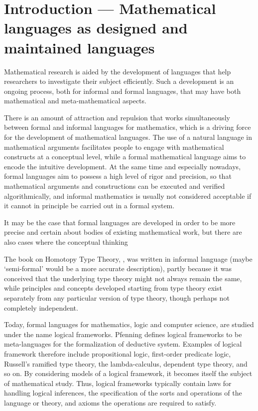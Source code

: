 \section{Introduction --- Mathematical languages as designed and maintained languages}
Mathematical research is aided by the development of languages that help 
researchers to investigate their subject efficiently. Such a development is an
ongoing process, both for informal and formal languages, that may have both
mathematical and meta-mathematical aspects. 

There is an amount of attraction and repulsion that works simultaneously
between formal and informal languages for mathematics, which is a driving force
for the development of mathematical languages. The use of
a natural language in mathematical arguments facilitates people to engage
with mathematical constructs at a conceptual level, while a formal mathematical
language aims to encode the intuitive development. At the same time and 
especially nowadays, formal languages aim to possess a high level of rigor and
precision, so that mathematical arguments and constructions can be executed and
verified algorithmically, and informal mathematics is usually not considered
acceptable if it cannot in principle be carried out in a formal system.

It may be the case that formal languages are developed in order to be more
precise and certain about bodies of existing mathematical work, but there are
also cases where the conceptual thinking 

The book on Homotopy Type Theory, \cite{TheBook}, was written in informal
language (maybe `semi-formal' would be a more accurate description), 
partly because it was conceived that the underlying type theory might
not always remain the same, while principles and concepts developed starting
from type theory exist separately from any particular version of type 
theory, though perhaps not completely independent. 

Today, formal languages for mathematics, logic and computer science, are studied
under the name logical frameworks.
Pfenning \cite{PfenningLFintro} defines logical frameworks
to be meta-languages for the formalization of deductive system. Examples of
logical framework therefore include propositional logic, first-order predicate 
logic, Russell's ramified type theory, the lambda-calculus, dependent type 
theory, and so on. By considering models of a logical framework, it becomes
itself the subject of mathematical study. Thus, logical frameworks typically
contain laws for handling logical inferences, the specification of the sorts
and operations of the language or theory, and axioms the operations are required to
satisfy. 

